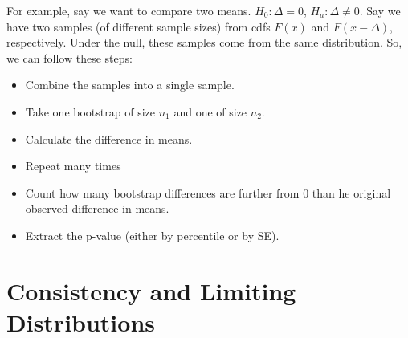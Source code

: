 \documentclass{book}
\theoremstyle{definition}
\begin{document}
For example, say we want to compare two means. $H_0 : \Delta = 0$, $H_a :\Delta \neq 0$. Say we have two samples (of different sample sizes) from cdfs $F(x)$ and $F(x - \Delta)$, respectively. Under the null, these samples come from the same distribution. So, we can follow these steps:
\begin{itemize}
	\item Combine the samples into a single sample.
	\item Take one bootstrap of size $n_1$ and one of size $n_2$. 
	\item Calculate the difference in means. 
	\item Repeat many times
	\item Count how many bootstrap differences are further from 0 than he original observed difference in means. 
	\item Extract the p-value (either by percentile or by SE).
\end{itemize}

































\newpage
































\chapter{Consistency and Limiting Distributions}
\end{document}

